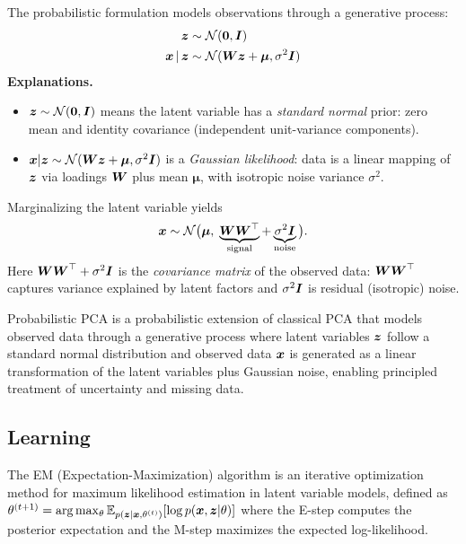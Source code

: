 The probabilistic formulation models observations through a generative process:
\begin{align}
\boldsymbol{z} &\sim \mathcal{N}(\boldsymbol{0}, \boldsymbol{I}) \\
\boldsymbol{x} \,|\, \boldsymbol{z} &\sim \mathcal{N}(\boldsymbol{W}\boldsymbol{z} + \boldsymbol{\mu}, \sigma^2 \boldsymbol{I})
\end{align}
\noindent\textbf{Explanations.}
\begin{itemize}[leftmargin=1.5em]
  \item $\boldsymbol{z} \sim \mathcal{N}(\boldsymbol{0}, \boldsymbol{I})$ means the latent variable has a \emph{standard normal} prior: zero mean and identity covariance (independent unit-variance components).
  \item $\boldsymbol{x} | \boldsymbol{z} \sim \mathcal{N}(\boldsymbol{W}\boldsymbol{z}+\boldsymbol{\mu}, \sigma^2\boldsymbol{I})$ is a \emph{Gaussian likelihood}: data is a linear mapping of $\boldsymbol{z}$ via loadings $\boldsymbol{W}$ plus mean $\boldsymbol{\mu}$, with isotropic noise variance $\sigma^2$.
\end{itemize}
Marginalizing the latent variable yields
\begin{equation}
\boldsymbol{x} \sim \mathcal{N}\big(\boldsymbol{\mu},\; \underbrace{\boldsymbol{W}\boldsymbol{W}^\top}_{\text{signal}} + \underbrace{\sigma^2\boldsymbol{I}}_{\text{noise}}\big).
\end{equation}
Here $\boldsymbol{W}\boldsymbol{W}^\top + \sigma^2\boldsymbol{I}$ is the \emph{covariance matrix} of the observed data: $\boldsymbol{W}\boldsymbol{W}^\top$ captures variance explained by latent factors and $\sigma^2\boldsymbol{I}$ is residual (isotropic) noise.

\begin{definition}
Probabilistic PCA is a probabilistic extension of classical PCA that models observed data through a generative process where latent variables $\boldsymbol{z}$ follow a standard normal distribution and observed data $\boldsymbol{x}$ is generated as a linear transformation of the latent variables plus Gaussian noise, enabling principled treatment of uncertainty and missing data.
\end{definition}

\subsection{Learning}

\begin{remark}[EM Algorithm]
The EM (Expectation-Maximization) algorithm is an iterative optimization method for maximum likelihood estimation in latent variable models, defined as $\theta^{(t+1)} = \arg\max_\theta \mathbb{E}_{p(\boldsymbol{z}|\boldsymbol{x},\theta^{(t)})}[\log p(\boldsymbol{x},\boldsymbol{z}|\theta)]$ where the E-step computes the posterior expectation and the M-step maximizes the expected log-likelihood.
\end{remark}

